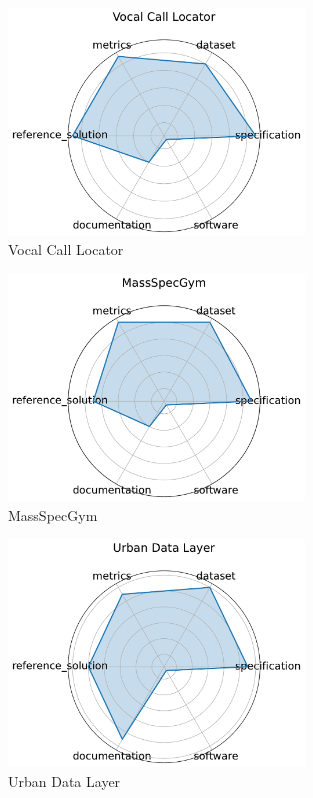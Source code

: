 \documentclass{article}
\begin{document}
\begin{figure}[h!]
  \centering
  \includegraphics[width=0.7\textwidth]{Vocal Call Locator_radar.pdf}
  \caption{Vocal Call Locator \cite{peterson2024vcl}}
\end{figure}

\begin{figure}[h!]
  \centering
  \includegraphics[width=0.7\textwidth]{MassSpecGym_radar.pdf}
  \caption{MassSpecGym \cite{bushuiev2024massspecgym}}
\end{figure}

\begin{figure}[h!]
  \centering
  \includegraphics[width=0.7\textwidth]{Urban Data Layer_radar.pdf}
  \caption{Urban Data Layer \cite{wang2024urbandatalayer}}
\end{figure}
\end{document}
